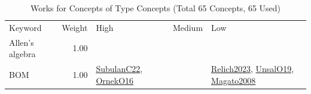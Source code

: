 {\scriptsize
\begin{longtable}{p{3cm}r>{\raggedright\arraybackslash}p{6cm}>{\raggedright\arraybackslash}p{6cm}>{\raggedright\arraybackslash}p{8cm}}
\rowcolor{white}\caption{Works for Concepts of Type Concepts (Total 65 Concepts, 65 Used)}\\ \toprule
\rowcolor{white}Keyword & Weight & High & Medium & Low\\ \midrule\endhead
\bottomrule
\endfoot
\index{Allen's algebra}\index{Concepts!Allen's algebra}Allen's algebra &  1.00 &  &  & \\
\index{BOM}\index{Concepts!BOM}BOM &  1.00 & \hyperref[detail:SubulanC22]{SubulanC22}, \hyperref[detail:OrnekO16]{OrnekO16} &  & \hyperref[detail:Relich2023]{Relich2023}, \hyperref[detail:UnsalO19]{UnsalO19}, \hyperref[detail:Magato2008]{Magato2008}\\

\end{longtable}}
